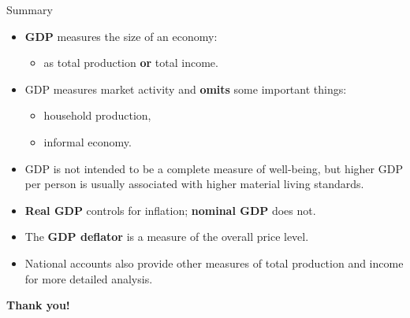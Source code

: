 \documentclass[aspectratio=169]{beamer}
\begin{document}
\begin{frame}{Summary}
\transfade
\begin{itemize}[<+->]
  \item \textbf{GDP} measures the size of an economy:
  \begin{itemize}[<+->]
    \item as total production \textbf{or} total income.
  \end{itemize}
  \item GDP measures market activity and \textbf{omits} some important things:
  \begin{itemize}[<+->]
    \item household production,
    \item informal economy.
  \end{itemize}
  \item GDP is not intended to be a complete measure of well-being, but higher GDP per person is usually associated with higher material living standards.
  \item \textbf{Real GDP} controls for inflation; \textbf{nominal GDP} does not.
  \item The \textbf{GDP deflator} is a measure of the overall price level.
  \item National accounts also provide other measures of total production and income for more detailed analysis.
\end{itemize}
\end{frame}

\begin{frame}
\centering
\Huge \textbf{Thank you!}
\end{frame}
\end{document}
